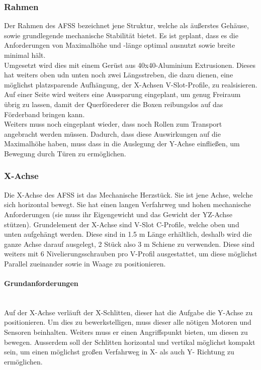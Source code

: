 \subsubsection{Rahmen}

Der Rahmen des AFSS bezeichnet jene Struktur, welche als äußerstes Gehäuse, sowie grundlegende mechanische Stabilität bietet. Es ist geplant, dass es die Anforderungen von Maximalhöhe und -länge optimal ausnutzt sowie breite minimal hält. \\
Umgesetzt wird dies mit einem Gerüst aus 40x40-Aluminium Extrusionen. Dieses hat weiters oben udn unten noch zwei Längsstreben, die dazu dienen, eine möglichst platzsparende Aufhängung, der X-Achsen V-Slot-Profile, zu realsisieren. Auf einer Seite wird weiters eine Aussparung eingeplant, um genug Freiraum übrig zu lassen, damit der Querförederer die Boxen reibungslos auf das Förderband bringen kann.\\
Weiters muss noch eingeplant wieder, dass noch Rollen zum Transport angebracht werden müssen. Dadurch, dass diese Auswirkungen auf die Maximalhöhe haben, muss dass in die Auslegung der Y-Achse einfließen, um Bewegung durch Türen zu ermöglichen.

\subsubsection{X-Achse}
Die X-Achse des AFSS ist das Mechanische Herzstück. Sie ist jene Achse, welche sich horizontal bewegt. Sie hat einen langen Verfahrweg und hohen mechanische Anforderungen (sie muss ihr Eigengewicht und das Gewicht der YZ-Achse stützen). 
Grundelement der X-Achse sind V-Slot C-Profile, welche oben und unten aufgehängt werden. Diese sind in 1.5 m Länge erhältlich, deshalb wird die ganze Achse darauf ausgelegt, 2 Stück also 3 m Schiene zu verwenden. Diese sind weiters mit 6 Nivelierungsschrauben pro V-Profil ausgestattet, um diese möglichst Parallel zueinander sowie in Waage zu positionieren.

\paragraph{Grundanforderungen}\mbox{}\\
Auf der X-Achse verläuft der X-Schlitten, dieser hat die Aufgabe die Y-Achse zu positionieren. Um dies zu bewerkstelligen, muss dieser alle nötigen Motoren und Sensoren beinhalten. Weiters muss er einen Angriffspunkt bieten, um diesen zu bewegen. Ausserdem soll der Schlitten horizontal und vertikal möglichst kompakt sein, um einen möglichst großen Verfahrweg in X- als auch Y- Richtung zu ermöglichen.

